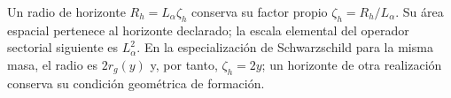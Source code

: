 Un radio de horizonte \(R_h=L_\alpha\zeta_h\) conserva su
factor propio \(\zeta_h=R_h/L_\alpha\). Su área espacial
pertenece al horizonte declarado; la escala elemental del operador
sectorial siguiente es \(L_\alpha^2\). En la especialización
de Schwarzschild para la misma masa, el radio es \(2r_g(y)\)
y, por tanto, \(\zeta_h=2y\); un horizonte de otra realización
conserva su condición geométrica de formación.
